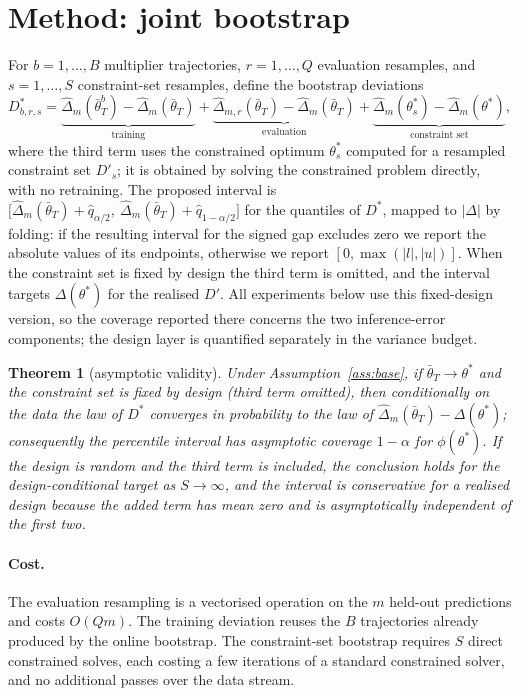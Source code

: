 \documentclass[11pt]{article}
\newtheorem{theorem}{Theorem}
\newcommand{\dhat}{\hat\Delta}
\newcommand{\tbar}{\bar\theta}
\newcommand{\Dp}{D'}
\begin{document}
\section{Method: joint bootstrap}
\label{sec:method}

For $b=1,\dots,B$ multiplier trajectories, $r=1,\dots,Q$ evaluation resamples, and $s=1,\dots,S$ constraint-set resamples, define the bootstrap deviations
\[
D^*_{b,r,s}
= \underbrace{\dhat_m(\bar\theta^b_T)-\dhat_m(\tbar_T)}_{\text{training}}
+ \underbrace{\dhat_{m,r}(\tbar_T)-\dhat_m(\tbar_T)}_{\text{evaluation}}
+ \underbrace{\dhat_{m}(\theta^*_s)-\dhat_m(\theta^*)}_{\text{constraint set}} ,
\]
where the third term uses the constrained optimum $\theta^*_s$ computed for a resampled constraint
set $\Dp_s$; it is obtained by solving the constrained problem directly, with no retraining.
The proposed interval is
$\big[\dhat_m(\tbar_T)+\hat q_{\alpha/2},\ \dhat_m(\tbar_T)+\hat q_{1-\alpha/2}\big]$
for the quantiles of $D^*$, mapped to $|\Delta|$ by folding: if the resulting interval for the signed
gap excludes zero we report the absolute values of its endpoints, otherwise we report
$[0,\max(|l|,|u|)]$.  When the constraint set is fixed by design the third term is omitted, and the interval targets
$\Delta(\theta^*)$ for the realised $\Dp$.  All experiments below use this fixed-design version, so
the coverage reported there concerns the two inference-error components; the design layer is
quantified separately in the variance budget.

\begin{theorem}[asymptotic validity]
\label{thm:joint}
Under Assumption~\ref{ass:base}, if $\tbar_T\to\theta^*$ and the constraint set is fixed by
design (third term omitted), then conditionally on the data the law of $D^*$ converges in
probability to the law of $\dhat_m(\tbar_T)-\Delta(\theta^*)$; consequently the percentile interval
has asymptotic coverage $1-\alpha$ for $\phi(\theta^*)$.  If the design is random and the third term is included, the conclusion holds for the design-conditional target as $S\to\infty$, and the interval is conservative for a realised design because the added term has mean zero and is asymptotically independent of the first two.
\end{theorem}

\paragraph{Cost.} The evaluation resampling is a vectorised operation on the $m$ held-out
predictions and costs $O(Qm)$.  The training deviation reuses the $B$ trajectories already produced
by the online bootstrap.  The constraint-set bootstrap requires $S$ direct constrained solves, each
costing a few iterations of a standard constrained solver, and no additional passes over the data
stream.
\end{document}
